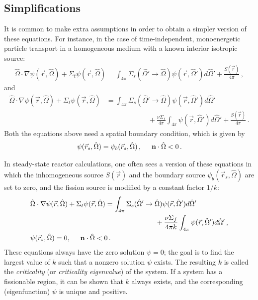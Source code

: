 \documentclass[12pt]{article}
\newcommand{\rvec}{\ensuremath{\vec{r}}}
\newcommand{\omvec}{\ensuremath{\hat{\Omega}}}
\begin{document}
\subsection*{Simplifications} 
It is common to make extra assumptions in order to obtain a simpler version of these equations. For instance, in the case of time-independent, monoenergetic particle transport in a homogeneous medium with a known interior isotropic source:
\begin{align*}
\omvec\cdot  \nabla \psi(\rvec,\omvec) +
 \Sigma_t\psi(\rvec,\omvec)
=
\int_{4\pi}\Sigma_s(\omvec'\rightarrow\omvec)
\psi(\rvec,\omvec')d\omvec'+\frac{S(\rvec)}{4\pi}\,,
\end{align*}
and 
\begin{align*}
\omvec\cdot  \nabla \psi(\rvec,\omvec) +
 \Sigma_t\psi(\rvec,\omvec)%
 &=
\int_{4\pi}\Sigma_s(\omvec'\rightarrow\omvec)
\psi(\rvec,\omvec')d\omvec'\\&\quad\quad\quad\quad\quad\quad
 +\frac{\nu\Sigma_f}{4\pi}\int_{4\pi}
\psi(\rvec,\omvec')d\omvec'+\frac{S(\rvec)}{4\pi}\,.\nonumber
\end{align*}
Both the equations above need a spatial boundary condition, which is given by
\begin{align*}
\psi(\rvec_s,\omvec) = \psi_b(\rvec_s,\omvec)\,, \hspace{0.5 cm} \textbf{n} \cdot \omvec <0\,.
\end{align*}

In steady-state reactor calculations, one often sees a version of these equations in which the inhomogeneous source $S(\rvec)$ and the boundary source $\psi_b(\rvec_s,\omvec)$ are set to zero, and the fission source is modified by a constant factor $1/k$:
\begin{align*}
&\omvec\cdot  \nabla \psi(\rvec,\omvec) +
 \Sigma_t\psi(\rvec,\omvec)%
 =
\int_{4\pi}\Sigma_s(\omvec'\rightarrow\omvec)
\psi(\rvec,\omvec')d\omvec'\\&\quad\quad\quad\quad\quad\quad\quad\quad\quad\quad\quad\quad\quad\quad\quad\quad\quad\quad
 +\frac{\nu\Sigma_f}{4\pi k}\int_{4\pi}
\psi(\rvec,\omvec')d\omvec'\,,\nonumber\\
&\psi(\rvec_s,\omvec) = 0, \hspace{0.5 cm} \textbf{n} \cdot \omvec <0\,.
\end{align*}
These equations always have the zero solution $\psi = 0$; the goal is to find the largest value of $k$ such that a nonzero solution $\psi$ exists. The resulting $k$ is called the \textit{criticality} (or \textit{criticality eigenvalue}) of the system. If a system has a fissionable region, it can be shown that $k$ always exists, and the corresponding (eigenfunction) $\psi$ is unique and positive.
\end{document}

